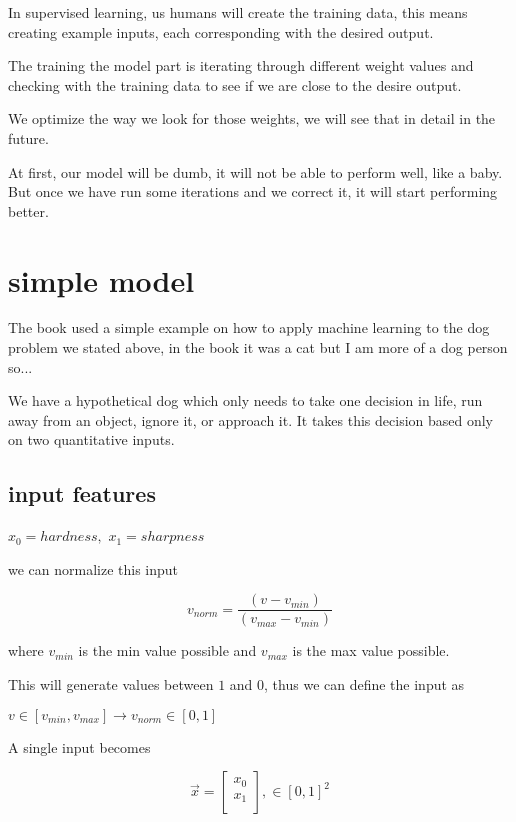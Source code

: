 \documentclass[twocolumn]{article}
\begin{document}
In supervised learning, us humans will create the training data, this means
creating example inputs, each corresponding with the desired output.

The training the model part is iterating through different weight values and
checking with the training data to see if we are close to the desire output.

We optimize the way we look for those weights, we will see that in detail in
the future.

At first, our model will be dumb, it will not be able to perform well, like a
baby. But once we have run some iterations and we correct it, it will start
performing better.

\section{simple model}

The book used a simple example on how to apply machine learning to the dog
problem we stated above, in the book it was a cat but I am more of a dog person
so...

We have a hypothetical dog which only needs to take one decision in life, run
away from an object, ignore it, or approach it. It takes this decision based
only on two quantitative inputs.

\subsection{input features}

{$ \displaystyle x_0 = hardness,$}
{$ x_1 = sharpness $}

we can normalize this input

\begin{equation}
v_{norm} = \dfrac{(v - v_{min})}{(v_{max} - v_{min})}
\end{equation}

where {$v_{min}$} is the min value possible and {$v_{max}$} is the max value
possible.

This will generate values between $1$ and $0$, thus we can define the input as

{$ v \in [v_{min}, v_{max}] \rightarrow v_{norm} \in [0, 1] $}

A single input becomes

\begin{equation}
    \vec{x} = \begin{bmatrix}
                x_0 \\
                x_1 \\
              \end{bmatrix},
              \in [0, 1]^2
\end{equation}
\end{document}
